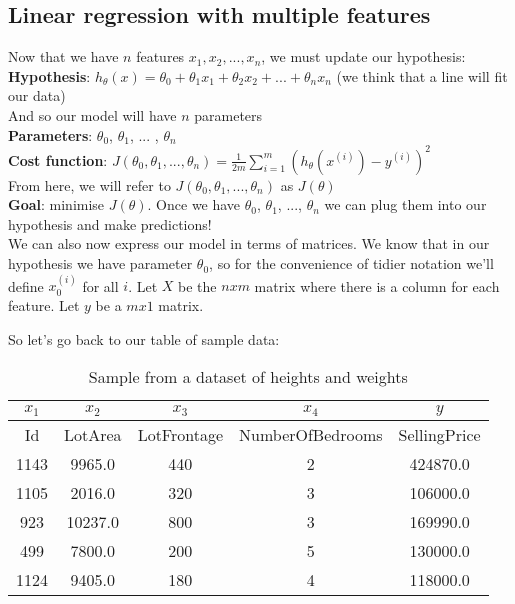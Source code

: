 \documentclass[11pt]{article}
\begin{document}
\subsection{Linear regression with multiple features}

Now that we have $n$ features $x_1, x_2, ..., x_n$, we must update our hypothesis:\\

\textbf{Hypothesis}: $h_\theta(x) = \theta_0 + \theta_1x_1+ \theta_2x_2 + ... +  \theta_nx_n$ (we think that a line will fit our data) \\

And so our model will have $n$ parameters \\

\textbf{Parameters}: $\theta_0$, $\theta_1$, ... , $\theta_n$ \\

\textbf{Cost function}: \(J(\theta_0, \theta_1,..., \theta_n) = \frac{1}{2m} \sum^m_{i=1}(h_\theta(x^{(i)}) - y^{(i)})^2\) \\

From here, we will refer to $J(\theta_0, \theta_1,..., \theta_n) $ as $J(\theta)$\\

\textbf{Goal}: minimise $J(\theta)$. Once we have $\theta_0$, $\theta_1$, ..., $\theta_n$ we can plug them into our hypothesis and make predictions!\\

We can also now express our model in terms of matrices. We know that in our hypothesis we have parameter $\theta_0$, so for the convenience of tidier notation we'll define $x_0^{(i)}$ for all $i$. Let $X$ be the $n x m$ matrix where there is a column for each feature. Let $y$ be a $m x 1$ matrix.

So let's go back to our table of sample data: 
\begin{table}[htp]
\caption{Sample from a dataset of heights and weights}
\label{table:sample-ames}
\begin{center}
\begin{tabular}{|c|c|c|c|c|}
\hline
$x_1$ & $x_2$ & $x_3$ & $x_4$ & $y$\\ \hline
Id & LotArea & LotFrontage & NumberOfBedrooms & SellingPrice \\ \hline
1143 & 9965.0 & 440 & 2 & 424870.0 \\
1105 & 2016.0 & 320 & 3 & 106000.0 \\
923 & 10237.0 & 800 & 3 & 169990.0\\
499& 7800.0 & 200 & 5 & 130000.0\\
1124 & 9405.0 & 180 & 4 & 118000.0 \\
\hline
\end{tabular}
\end{center}
\label{Sample housing price data}
\end{table}%
\end{document}
